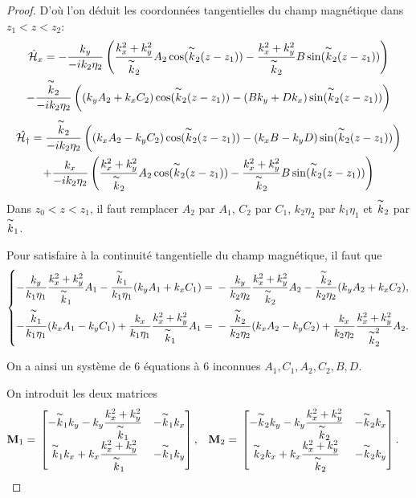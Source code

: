 \begin{proof}
    D'où l'on déduit les coordonnées tangentielles du champ magnétique dans \(z_1<z<z_2\):
    \begin{multline*}
    \hat{\mathcal{H}}_x = -\dfrac{k_y}{-ik_2\eta_2}\left(\dfrac{k_x^2+k_y^2}{\overset{\thicksim}{k}_2}A_2\cos(\overset{\thicksim}{k}_2(z-z_1))-\dfrac{k_x^2+k_y^2}{\overset{\thicksim}{k}_2}B\sin(\overset{\thicksim}{k}_2(z-z_1))\right)
    \\
    -\dfrac{\overset{\thicksim}{k}_2}{-ik_2\eta_2}\left((k_yA_2+k_xC_2)\cos(\overset{\thicksim}{k}_2(z-z_1))-(Bk_y+Dk_x)\sin(\overset{\thicksim}{k}_2(z-z_1))\right)
    \end{multline*}
    \begin{multline*}
    \hat{\mathcal{H_y}} = \dfrac{\overset{\thicksim}{k}_2}{-ik_2\eta_2}\left((k_xA_2-k_yC_2)\cos(\overset{\thicksim}{k}_2(z-z_1))-(k_xB-k_yD)\sin(\overset{\thicksim}{k}_2(z-z_1))\right)
    \\
    +\dfrac{k_x}{-ik_2\eta_2}\left(\dfrac{k_x^2+k_y^2}{\overset{\thicksim}{k}_2}A_2\cos(\overset{\thicksim}{k}_2(z-z_1))-\dfrac{k_x^2+k_y^2}{\overset{\thicksim}{k}_2}B\sin(\overset{\thicksim}{k}_2(z-z_1))\right)
    \end{multline*}
    Dans \(z_0<z<z_1\), il faut remplacer \(A_2\) par \(A_1\), \(C_2\) par \(C_1\), \(k_2\eta_2\) par \(k_1\eta_1\) et \(\overset{\thicksim}{k}_2\) par \(\overset{\thicksim}{k}_1\).


    Pour satisfaire à la continuité tangentielle du champ magnétique, il faut que
    \[
    \left\{
    \begin{aligned}
    -\dfrac{k_y}{k_1\eta_1}\dfrac{k_x^2+k_y^2}{\overset{\thicksim}{k}_1}A_1-\dfrac{\overset{\thicksim}{k}_1}{k_1\eta_1}(k_yA_1+k_xC_1)={}&-\dfrac{k_y}{k_2\eta_2}\dfrac{k_x^2+k_y^2}{\overset{\thicksim}{k}_2}A_2-\dfrac{\overset{\thicksim}{k}_2}{k_2\eta_2}(k_yA_2+k_xC_2),
    \\
    -\dfrac{\overset{\thicksim}{k}_1}{k_1\eta_1}(k_xA_1-k_yC_1)+\dfrac{k_x}{k_1\eta_1}\dfrac{k_x^2+k_y^2}{\overset{\thicksim}{k}_1}A_1={}&-\dfrac{\overset{\thicksim}{k}_2}{k_2\eta_2}(k_xA_2-k_yC_2)+\dfrac{k_x}{k_2\eta_2}\dfrac{k_x^2+k_y^2}{\overset{\thicksim}{k}_2^2}A_2.
    \end{aligned}
    \right.
    \]

    On a ainsi un système de 6 équations à 6 inconnues \(A_1,C_1,A_2,C_2,B,D\).

    On introduit les deux matrices
    \begin{align*}
    \mathbf{M}_1={}&
    \begin{bmatrix}
    -\overset{\thicksim}{k}_1k_y-k_y\dfrac{k_x^2+k_y^2}{\overset{\thicksim}{k}_1}  &   -\overset{\thicksim}{k}_1k_x
    \cr
    \overset{\thicksim}{k}_1k_x+k_x\dfrac{k_x^2+k_y^2}{\overset{\thicksim}{k}_1}   &   -\overset{\thicksim}{k}_1k_y
    \end{bmatrix},
    &
    \mathbf{M}_2={}&
    \begin{bmatrix}
    -\overset{\thicksim}{k}_2k_y-k_y\dfrac{k_x^2+k_y^2}{\overset{\thicksim}{k}_2}  &   -\overset{\thicksim}{k}_2k_x
    \cr
    \overset{\thicksim}{k}_2k_x+k_x\dfrac{k_x^2+k_y^2}{\overset{\thicksim}{k}_2}   &   -\overset{\thicksim}{k}_2k_y
    \end{bmatrix}.
    \end{align*}


\end{proof}
